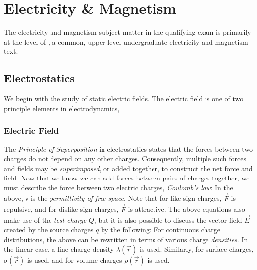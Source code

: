 \newpage
\chapter{Electricity \& Magnetism}
\label{sec:electro}
The electricity and magnetism subject matter in the qualifying exam is primarily at the level of \cite{griffithsIntroductionElectrodynamics2018}, a common, upper-level undergraduate electricity and magnetism text.


\section{Electrostatics}
We begin with the study of static electric fields. The electric field is one of two principle elements in electrodynamics, 
\subsection{Electric Field}
The \textit{Principle of Superposition} in electrostatics states that the forces between two charges do not depend on any other charges. Consequently, multiple such forces and fields may be \textit{superimposed}, or added together, to construct the net force and field.
Now that we know we can add forces between pairs of charges together, we must describe the force between two electric charges, \textit{Coulomb's law}:
In the above, $\epsilon$ is the \textit{permittivity of free space}. Note that for like sign charges, $\vec{F}$ is repulsive, and for dislike sign charges, $\vec{F}$ is attractive.
The above equations also make use of the \textit{test charge} $Q$, but it is also possible to discuss the vector field $\vec{E}$ created by the source charges $q$ by the following:
For continuous charge distributions, the above can be rewritten in terms of various charge \textit{densities}. In the linear case, a line charge density $\lambda(\vec{r})$ is used. Similarly, for surface charges, $\sigma(\vec{r})$ is used, and for volume charges $\rho(\vec{r})$ is used.
